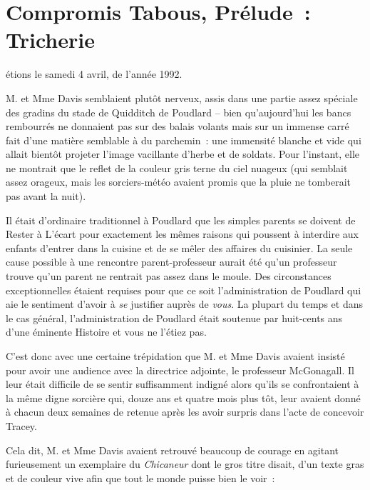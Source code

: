 \chapter{Compromis Tabous, Prélude~: Tricherie}

 étions le samedi 4 avril, de l'année 1992.

\hplettrineextrapara
M. et Mme Davis semblaient plutôt nerveux, assis dans une partie assez spéciale des gradins du stade de Quidditch de Poudlard -- bien qu'aujourd'hui les bancs rembourrés ne donnaient pas sur des balais volants mais sur un immense carré fait d'une matière semblable à du parchemin~: une immensité blanche et vide qui allait bientôt projeter l'image vacillante d'herbe et de soldats.
Pour l'instant, elle ne montrait que le reflet de la couleur gris terne du ciel nuageux (qui semblait assez orageux, mais les sorciers-météo avaient promis que la pluie ne tomberait pas avant la nuit).

Il était d'ordinaire traditionnel à Poudlard que les simples parents se doivent de Rester à L'écart pour exactement les mêmes raisons qui poussent à interdire aux enfants d'entrer dans la cuisine et de se mêler des affaires du cuisinier.
La seule cause possible à une rencontre parent-professeur aurait été qu'un professeur trouve qu'un parent ne rentrait pas assez dans le moule.
Des circonstances exceptionnelles étaient requises pour que ce soit l'administration de Poudlard qui aie le sentiment d'avoir à \emph{se} justifier auprès de \emph{vous}.
La plupart du temps et dans le cas général, l'administration de Poudlard était soutenue par huit-cents ans d'une éminente Histoire et vous ne l'étiez pas.

C'est donc avec une certaine trépidation que M. et Mme Davis avaient insisté pour avoir une audience avec la directrice adjointe, le professeur McGonagall.
Il leur était difficile de se sentir suffisamment indigné alors qu'ils se confrontaient à la même digne sorcière qui, douze ans et quatre mois plus tôt, leur avaient donné à chacun deux semaines de retenue après les avoir surpris dans l'acte de concevoir Tracey.

Cela dit, M. et Mme Davis avaient retrouvé beaucoup de courage en agitant furieusement un exemplaire du \emph{Chicaneur} dont le gros titre disait, d'un texte gras et de couleur vive afin que tout le monde puisse bien le voir~:


